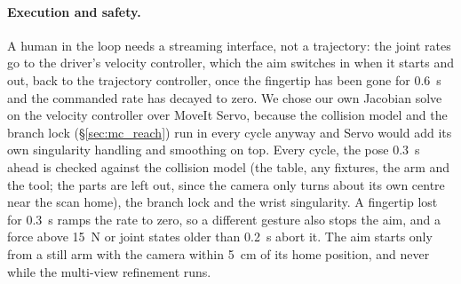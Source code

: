 \paragraph{Execution and safety.} A human in the loop needs a streaming interface, not a
trajectory: the joint rates go to the driver's velocity controller, which the aim switches in when
it starts and out, back to the trajectory controller, once the fingertip has been gone for 0.6~s
and the commanded rate has decayed to zero. We chose our own
Jacobian solve on the velocity controller over MoveIt Servo, because the collision model and the
branch lock (\S\ref{sec:mc_reach}) run in every cycle anyway and Servo would add its own
singularity handling and smoothing on top. Every cycle, the pose 0.3~s ahead is checked against
the collision model (the table, any fixtures, the arm and the tool; the parts are left out, since
the camera only turns about its own centre near the scan home), the branch lock and the wrist
singularity. A fingertip lost for 0.3~s ramps the rate to zero, so a different gesture also stops
the aim, and a force above 15~N or joint states older than 0.2~s abort it. The aim starts
only from a still arm with the camera within 5~cm of its home position, and never while the
multi-view refinement runs.

